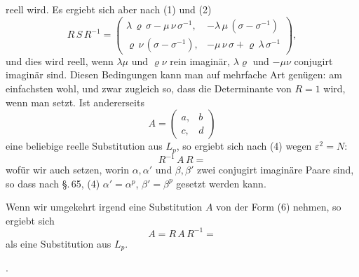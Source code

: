reell wird. Es ergiebt sich aber nach (1) und (2)
\[
R\,S\,R^{-1} = \begin{pmatrix} \lambda\,\varrho\,\sigma - \mu\,\nu\,\sigma^{-1}, & -\lambda\,\mu\,(\sigma-\sigma^{-1}) \\ \varrho\,\nu\,(\sigma-\sigma^{-1}), & -\mu\,\nu\,\sigma+\varrho\,\lambda\,\sigma^{-1} \end{pmatrix},
\]
und dies wird reell, wenn $\lambda\mu$ und $\varrho\nu$ rein imaginär, $\lambda\varrho$ und
$-\mu\nu$ conjugirt imaginär sind. Diesen Bedingungen kann man
auf mehrfache Art genügen: am einfachsten wohl, und zwar
zugleich so, dass die Determinante von $R = 1$ wird, wenn man
setzt. Ist andererseits
\[
A = \begin{pmatrix} a, & b \\ c, & d \end{pmatrix}
\]
eine beliebige reelle Substitution aus $L_p$, so ergiebt sich nach (4)
wegen $\varepsilon^2 = N$:
\[
R^{-1}\,A\,R =
\]
wofür wir auch
setzen, worin $\alpha,\alpha'$ und $\beta,\beta'$ zwei conjugirt imaginäre Paare
sind, so dass nach §.\,65, (4) $\alpha' = \alpha^p$, $\beta' = \beta^p$ gesetzt werden
kann.

Wenn wir umgekehrt irgend eine Substitution $A$ von der
Form (6) nehmen, so ergiebt sich
\[
A = R\,A\,R^{-1} =
\]
als eine  Substitution aus $L_p$.

.
